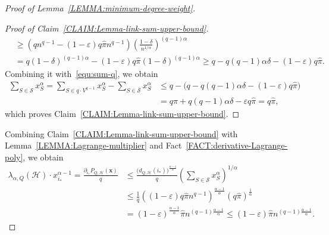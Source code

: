 \documentclass[11pt,a4paper]{article}
\begin{document}
\begin{proof}[Proof of Lemma~\ref{LEMMA:minimum-degree-weight}]
\begin{proof}[Proof of Claim~\ref{CLAIM:Lemma-link-sum-upper-bound}]
\begin{align*}
            & \ge \left(q n^{q-1} - (1-\varepsilon) q  \hat{\pi}  n^{q-1} \right) \left(\frac{1-\delta}{n^{1/\alpha}}\right)^{(q-1)\alpha} \\
            & = q (1-\delta)^{(q-1)\alpha} - (1-\varepsilon) q  \hat{\pi} (1-\delta)^{(q-1)\alpha} 
            \ge q - q(q-1)\alpha \delta  - (1-\varepsilon) q  \hat{\pi}.  
        \end{align*}
        Combining it with~\eqref{equ:sum-q}, we obtain 
        \begin{align*}
            \sum_{S \in \mathcal{S}} x_{S}^{\alpha}
            = \sum_{S \in q \cdot V^{q-1}} x_{S}^{\alpha} - \sum_{S \in \bar{\mathcal{S}}} x_{S}^{\alpha} 
            & \le q - \big( q - q(q-1)\alpha \delta  - (1-\varepsilon) q  \hat{\pi} \big) \\
            & = q  \hat{\pi} + q(q-1)\alpha \delta - \varepsilon q  \hat{\pi}
            = q  \hat{\pi},
        \end{align*}
        which proves Claim~\ref{CLAIM:Lemma-link-sum-upper-bound}. 
    \end{proof}%
    
    
    Combining Claim~\ref{CLAIM:Lemma-link-sum-upper-bound} with Lemma~\ref{LEMMA:Lagrange-multiplier} and Fact~\ref{FACT:derivative-Lagrange-poly}, we obtain 
    \begin{align*}
        \lambda_{\alpha,Q}(\mathcal{H}) \cdot x_{i_{\ast}}^{\alpha-1}
        = \frac{\partial_{i_{\ast}} P_{Q, \mathcal{H}}(\mathbf{x})}{q} 
        & \le \frac{\big(d_{Q,\mathcal{H}}(i_{\ast})\big)^{\frac{\alpha-1}{\alpha}}}{q} \left(\sum_{S \in \mathcal{S}} x_{S}^{\alpha}\right)^{1/\alpha} \\
        & \le \frac{1}{q} \left((1-\varepsilon)q \hat{\pi} n^{q-1}\right)^{\frac{\alpha-1}{\alpha}} \left(q \hat{\pi}\right)^{\frac{1}{\alpha}} \\
        & =  (1-\varepsilon)^{\frac{\alpha-1}{\alpha}} \hat{\pi} n^{(q-1)\frac{\alpha-1}{\alpha}}
        \le (1-\varepsilon) \hat{\pi} n^{(q-1)\frac{\alpha-1}{\alpha}}.
    \end{align*}


\end{proof}
\end{document}
